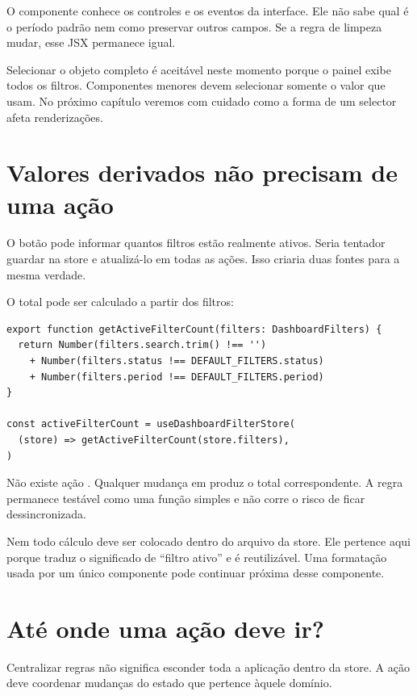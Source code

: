O componente conhece os controles e os eventos da interface. Ele não sabe qual
é o período padrão nem como preservar outros campos. Se a regra de limpeza
mudar, esse JSX permanece igual.

Selecionar o objeto completo é aceitável neste momento porque o painel exibe
todos os filtros. Componentes menores devem selecionar somente o valor que
usam. No próximo capítulo veremos com cuidado como a forma de um selector afeta
renderizações.

\section{Valores derivados não precisam de uma ação}

O botão pode informar quantos filtros estão realmente ativos. Seria tentador
guardar  na store e atualizá-lo em todas as ações. Isso
criaria duas fontes para a mesma verdade.

O total pode ser calculado a partir dos filtros:

\begin{lstlisting}[caption={Valor derivado calculado a partir da fonte de verdade.}]
export function getActiveFilterCount(filters: DashboardFilters) {
  return Number(filters.search.trim() !== '')
    + Number(filters.status !== DEFAULT_FILTERS.status)
    + Number(filters.period !== DEFAULT_FILTERS.period)
}

const activeFilterCount = useDashboardFilterStore(
  (store) => getActiveFilterCount(store.filters),
)
\end{lstlisting}

Não existe ação . Qualquer mudança em
 produz o total correspondente. A regra permanece testável como
uma função simples e não corre o risco de ficar dessincronizada.

Nem todo cálculo deve ser colocado dentro do arquivo da store. Ele pertence
aqui porque traduz o significado de ``filtro ativo'' e é reutilizável. Uma
formatação usada por um único componente pode continuar próxima desse
componente.

\section{Até onde uma ação deve ir?}

Centralizar regras não significa esconder toda a aplicação dentro da store. A
ação deve coordenar mudanças do estado que pertence àquele domínio.

